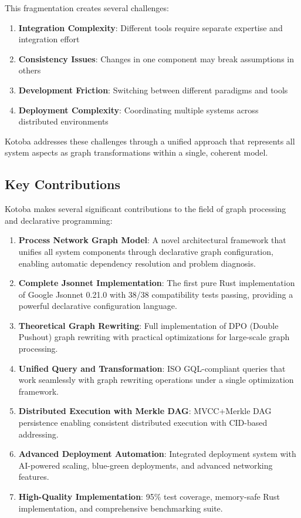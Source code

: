 \documentclass[11pt,a4paper]{article}
\begin{document}
This fragmentation creates several challenges:
\begin{enumerate}
\item \textbf{Integration Complexity}: Different tools require separate expertise and integration effort
\item \textbf{Consistency Issues}: Changes in one component may break assumptions in others
\item \textbf{Development Friction}: Switching between different paradigms and tools
\item \textbf{Deployment Complexity}: Coordinating multiple systems across distributed environments
\end{enumerate}

Kotoba addresses these challenges through a unified approach that represents all system aspects as graph transformations within a single, coherent model.

\subsection{Key Contributions}
\label{subsec:contributions}

Kotoba makes several significant contributions to the field of graph processing and declarative programming:

\begin{enumerate}
\item \textbf{Process Network Graph Model}: A novel architectural framework that unifies all system components through declarative graph configuration, enabling automatic dependency resolution and problem diagnosis.

\item \textbf{Complete Jsonnet Implementation}: The first pure Rust implementation of Google Jsonnet 0.21.0 with 38/38 compatibility tests passing, providing a powerful declarative configuration language.

\item \textbf{Theoretical Graph Rewriting}: Full implementation of DPO (Double Pushout) graph rewriting with practical optimizations for large-scale graph processing.

\item \textbf{Unified Query and Transformation}: ISO GQL-compliant queries that work seamlessly with graph rewriting operations under a single optimization framework.

\item \textbf{Distributed Execution with Merkle DAG}: MVCC+Merkle DAG persistence enabling consistent distributed execution with CID-based addressing.

\item \textbf{Advanced Deployment Automation}: Integrated deployment system with AI-powered scaling, blue-green deployments, and advanced networking features.

\item \textbf{High-Quality Implementation}: 95\% test coverage, memory-safe Rust implementation, and comprehensive benchmarking suite.
\end{enumerate}
\end{document}
